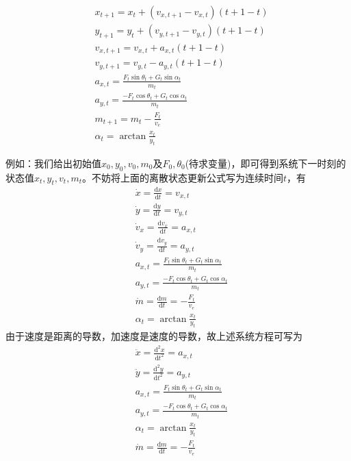            \begin{align*}
            & x_{t+1}  =x_t + (v_{x,t+1}-v_{x,t})(t+1-t)\\
            & y_{t+1}  =y_t + (v_{y,t+1}-v_{y,t})(t+1-t)\\
            & v_{x,t+1} = v_{x,t}+a_{x,t}(t+1-t)\\
            & v_{y,t+1} = v_{y,t}-a_{y,t}(t+1-t)\\
            & a_{x,t} = \frac{F_t\sin \theta_t+G_t\sin \alpha_t}{m_t}\\
            & a_{y,t} = \frac{-F_t\cos \theta_t+G_t\cos \alpha_t}{m_t}\\
            & m_{t+1} = m_t - \frac{F_t}{v_e}\\
            & \alpha_t = \arctan \frac{x_t}{y_t}
            \end{align*}
            \par
            例如：我们给出初始值$x_0,y_0,v_0,m_0$及$F_0,\theta_0$(待求变量)，即可得到系统下一时刻的状态值$x_t,y_t,v_t,m_t$。不妨将上面的离散状态更新公式写为连续时间$t$，有
            \begin{align*}
            & \dot{x} = \frac{\mathrm{d}x}{\mathrm{d}t} = v_{x,t}\\
            & \dot{y} = \frac{\mathrm{d}y}{\mathrm{d}t} = v_{y,t}\\
            & \dot{v}_x = \frac{\mathrm{d}v_x}{\mathrm{d}t} = a_{x,t}\\
            & \dot{v}_y = \frac{\mathrm{d}v_y}{\mathrm{d}t} = a_{y,t}\\
            & a_{x,t} = \frac{F_t\sin \theta_t+G_t\sin \alpha_t}{m_t}\\
            & a_{y,t} = \frac{-F_t\cos \theta_t+G_t\cos \alpha_t}{m_t}\\
            & \dot{m} = \frac{\mathrm{d}m}{\mathrm{d}t} = -\frac{F_t}{v_e}\\
            & \alpha_t = \arctan\frac{x_t}{y_t}
            \end{align*}
            由于速度是距离的导数，加速度是速度的导数，故上述系统方程可写为
            \begin{align*}
            &\ddot{x} = \frac{\mathrm{d}^2x}{\mathrm{d}t^2} = a_{x,t}\\
            &\ddot{y} = \frac{\mathrm{d}^2y}{\mathrm{d}t^2} = a_{y,t}\\
            & a_{x,t} = \frac{F_t\sin \theta_t+G_t\sin \alpha_t}{m_t}\\
            & a_{y,t} = \frac{-F_t\cos \theta_t+G_t\cos \alpha_t}{m_t}\\
            &\alpha_t = \arctan\frac{x_t}{y_t}\\
            & \dot{m} = \frac{\mathrm{d}m}{\mathrm{d}t} = -\frac{F_t}{v_e}
            \end{align*}
